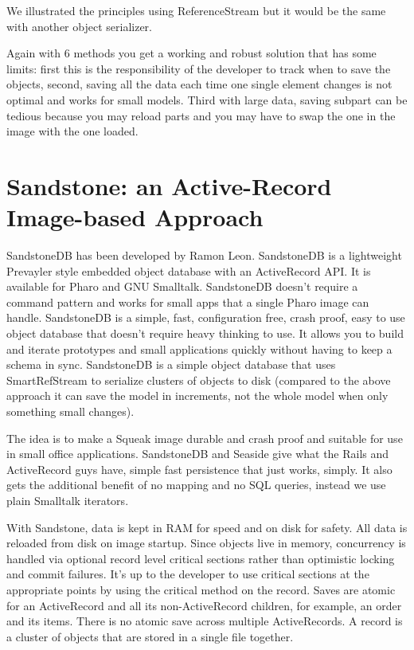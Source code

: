 \documentclass[a4paper,10pt,twoside]{book}
\newcommand{\ct}[1]{{\small\ttfamily\textup{#1}}}
\begin{document}
We illustrated the principles using \ct{ReferenceStream} but it would be the same with another object serializer.

Again with 6 methods you get a working and robust solution that has some limits: first this is the responsibility of the developer to track when to save the objects, second, saving all the data each time one single element changes is not optimal and works for small models. Third with large data, saving subpart can be tedious because you may reload parts and you may have to swap the one in the image with the one loaded.

\section{Sandstone: an Active-Record Image-based Approach}
\label{book:advanced:persistency:sandstone}

SandstoneDB has been developed by Ramon Leon. SandstoneDB is a lightweight Prevayler style embedded object database with an ActiveRecord API. It is available for Pharo and GNU Smalltalk. SandstoneDB doesn't require a command pattern and works for small apps that a single Pharo image can handle. SandstoneDB is a simple, fast, configuration free, crash proof, easy to use object database that doesn't require heavy thinking to use. It allows you to build and iterate prototypes and small applications quickly without having to keep a schema in sync. SandstoneDB is a simple object database that uses \ct{SmartRefStream} to serialize clusters of objects to disk (compared to the above approach it can save the model in increments, not the whole model when only something small changes).

The idea is to make a Squeak image durable and crash proof and suitable for use in small office applications. SandstoneDB and Seaside give what the Rails and ActiveRecord guys have, simple fast persistence that just works, simply. It also gets the additional benefit of no mapping and no SQL queries, instead we use plain Smalltalk iterators.

With Sandstone, data is kept in RAM for speed and on disk for safety. All data is reloaded from disk on image startup. Since objects live in memory, concurrency is handled via optional record level critical sections rather than optimistic locking and commit failures. It's up to the developer to use critical sections at the appropriate points by using the critical method on the record. Saves are atomic for an ActiveRecord and all its non-ActiveRecord children, for example, an order and its items. There is no atomic save across multiple ActiveRecords. A record is a cluster of objects that are stored in a single file together.
\end{document}
